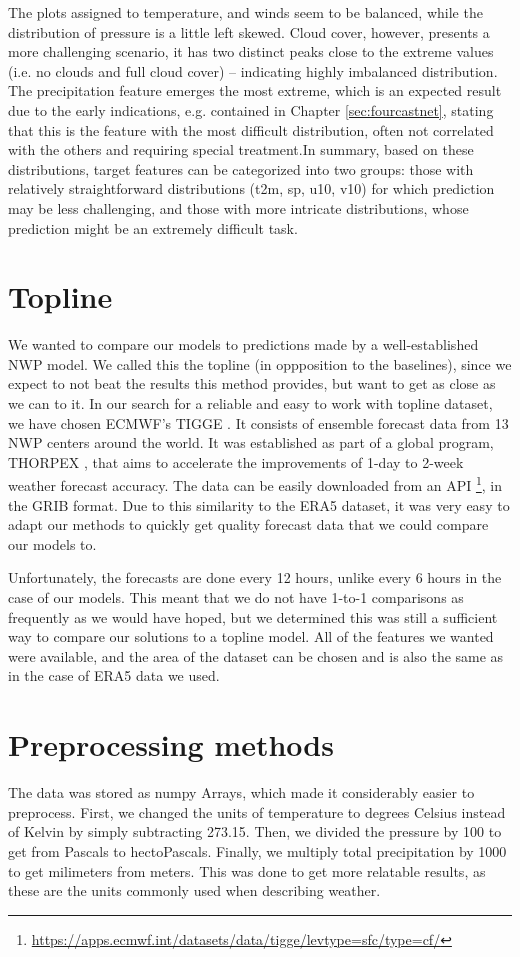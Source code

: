 The plots assigned to temperature, and winds seem to be balanced, while the distribution of pressure is a little left skewed. Cloud cover, however, presents a more challenging scenario, it has two distinct peaks close to the extreme values (i.e. no clouds and full cloud cover) -- indicating highly imbalanced distribution. The precipitation feature emerges the most extreme, which is an expected result due to the early indications, e.g. contained in Chapter \ref{sec:fourcastnet}, stating that this is the feature with the most difficult distribution, often not correlated with the others and requiring special treatment.In summary, based on these distributions, target features can be categorized into two groups: those with relatively straightforward distributions (t2m, sp, u10, v10) for which prediction may be less challenging, and those with more intricate distributions, whose prediction might be an extremely difficult task. 


\section{Topline}
We wanted to compare our models to predictions made by a well-established NWP model. We called this the topline (in oppposition to the baselines), since we expect to not beat the results this method provides, but want to get as close as we can to it.
In our search for a reliable and easy to work with topline dataset, we have chosen ECMWF's TIGGE \cite{tigge}. It consists of ensemble forecast data from 13 NWP centers around the world. It was established as part of a global program, THORPEX \cite{bougeault2010thorpex}, that aims to accelerate the improvements of 1-day to 2-week weather forecast accuracy. The data can be easily downloaded from an API \footnote{\url{https://apps.ecmwf.int/datasets/data/tigge/levtype=sfc/type=cf/}}, in the GRIB format. Due to this similarity to the ERA5 dataset, it was very easy to adapt our methods to quickly get quality forecast data that we could compare our models to.

Unfortunately, the forecasts are done every 12 hours, unlike every 6 hours in the case of our models. This meant that we do not have 1-to-1 comparisons as frequently as we would have hoped, but we determined this was still a sufficient way to compare our solutions to a topline model. All of the features we wanted were available, and the area of the dataset can be chosen and is also the same as in the case of ERA5 data we used.

\section{Preprocessing methods}\label{chap:preprocesing}
The data was stored as numpy \cite{harris2020array} Arrays, which made it considerably easier to preprocess. First, we changed the units of temperature to degrees Celsius instead of Kelvin by simply subtracting 273.15. Then, we divided the pressure by 100 to get from Pascals to hectoPascals. Finally, we multiply total precipitation by 1000 to get milimeters from meters. This was done to get more relatable results, as these are the units commonly used when describing weather.

